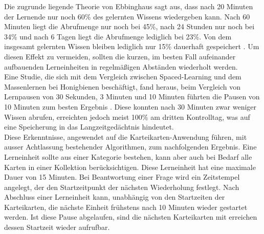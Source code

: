Die zugrunde liegende Theorie von Ebbinghaus sagt aus, dass nach 20 Minuten der Lernende nur noch 60{\%} des gelernten Wissens wiedergeben kann. Nach 60 Minuten liegt die Abrufmenge nur noch bei 45{\%}, nach 24 Stunden nur noch bei 34{\%} und nach 6 Tagen liegt die Abrufmenge lediglich bei 23{\%}. Von dem insgesamt gelernten Wissen bleiben lediglich nur 15{\%} dauerhaft gespeichert \cite{Liss.2020}. Um diesen Effekt zu vermeiden, sollten die kurzen, im besten Fall aufeinander aufbauenden Lerneinheiten in regelmäßigen Abständen wiederholt werden. \\

Eine Studie, die sich mit dem Vergleich zwischen Spaced-Learning und dem Massenlernen bei Honigbienen beschäftigt, fand heraus, beim Vergleich von Lernpausen von 30 Sekunden, 3 Minuten und 10 Minuten führten die Pausen von 10 Minuten zum besten Ergebnis \cite{Menzel.2001}. Diese konnten nach 30 Minuten zwar weniger Wissen abrufen, erreichten jedoch meist 100{\%} am dritten Kontrolltag, was auf eine Speicherung in das Langzeitgedächtnis hindeutet. \\

Diese Erkenntnisse, angewendet auf die Karteikarten-Anwendung führen, mit ausser Achtlassung bestehender Algorithmen, zum nachfolgenden Ergebnis. Eine Lerneinheit sollte aus einer Kategorie bestehen, kann aber auch bei Bedarf alle Karten in einer Kollektion berücksichtigen. Diese Lerneinheit hat eine maximale Dauer von 15 Minuten. Bei Beantwortung einer Frage wird ein Zeitstempel angelegt, der den Startzeitpunkt der nächsten Wiederholung festlegt. Nach Abschluss einer Lerneinheit kann, unabhängig von den Startzeiten der Karteikarten, die nächste Einheit frühstens nach 10 Minuten wieder gestartet werden. Ist diese Pause abgelaufen, sind die nächsten Karteikarten mit erreichen dessen Startzeit wieder aufrufbar.






